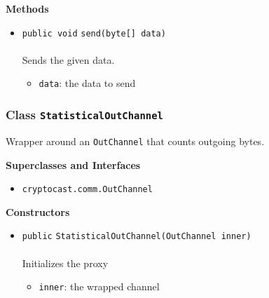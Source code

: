 \textbf{\sffamily Methods}
\begin{itemize}
\item \lstinline|public void| \lstinline|send|\lstinline|(byte[] data)|\\ \\[-0.6em]
Sends the given data.
\begin{itemize}
\item \lstinline|data|: the data to send
\end{itemize}



\end{itemize}

\subsubsection{Class \lstinline|StatisticalOutChannel|}
Wrapper around an \lstinline|OutChannel| that counts outgoing bytes. \\
\noindent\begin{minipage}[t]{5cm}
\vspace{0.3em}
\hspace*{2em}
\vspace{0.3em}
\end{minipage}



\textbf{\sffamily Superclasses and Interfaces}
\begin{itemize}
\item \lstinline|cryptocast.comm.OutChannel|
\end{itemize}


\textbf{\sffamily Constructors}
\begin{itemize}
\item \lstinline|public| \lstinline|StatisticalOutChannel|\lstinline|(OutChannel inner)|\\ \\[-0.6em]
Initializes the proxy
\begin{itemize}
\item \lstinline|inner|: the wrapped channel
\end{itemize}



\end{itemize}


